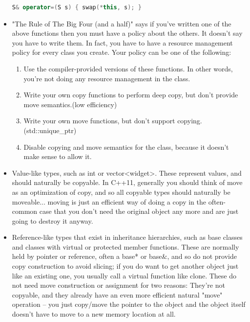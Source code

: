 \documentclass[a4paper,11pt,twoside]{book}
\begin{document}
\begin{itemize}
\begin{lstlisting}[frame=single, language=c++]
S& operator=(S s) { swap(*this, s); }
\end{lstlisting}

	\item "The Rule of The Big Four (and a half)" says if you've written one of the above functions then you must have a policy about the others. It doesn't say you have to write them. In fact, you have to have a resource management policy for every class you create. Your policy can be one of the following:
	\begin{enumerate}
		\item Use the compiler-provided versions of these functions. In other words, you're not doing any resource management in the class.
		
		\item Write your own copy functions to perform deep copy, but don't provide move semantics.(low efficiency)
		
		\item Write your own move functions, but don't support copying.(std::unique\_ptr)
		
		\item Disable copying and move semantics for the class, because it doesn't make sense to allow it.
	\end{enumerate}

	\item Value-like types, such as int or vector<widget>. These represent values, and should naturally be copyable. In C++11, generally you should think of move as an optimization of copy, and so all copyable types should naturally be moveable... moving is just an efficient way of doing a copy in the often-common case that you don't need the original object any more and are just going to destroy it anyway.
	
	\item Reference-like types that exist in inheritance hierarchies, such as base classes and classes with virtual or protected member functions. These are normally held by pointer or reference, often a base* or base\&, and so do not provide copy construction to avoid slicing; if you do want to get another object just like an existing one, you usually call a virtual function like clone. These do not need move construction or assignment for two reasons: They're not copyable, and they already have an even more efficient natural "move" operation -- you just copy/move the pointer to the object and the object itself doesn't have to move to a new memory location at all.
	

\end{itemize}
\end{document}
